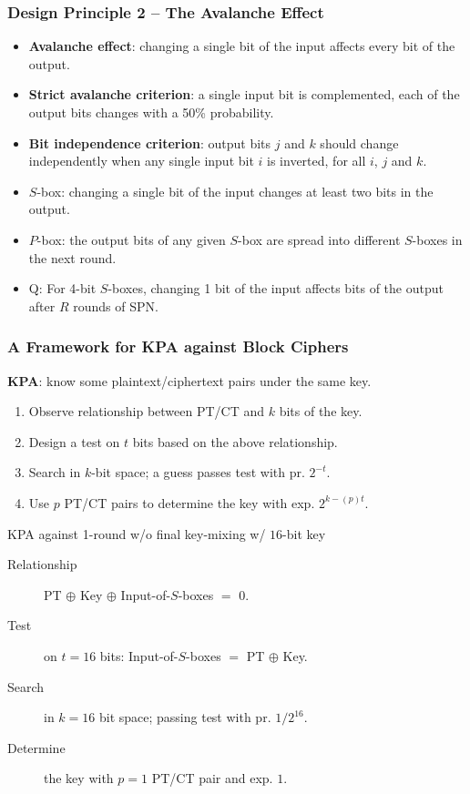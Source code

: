 \begin{frame}\frametitle{Design Principle 2 -- The Avalanche Effect}
\begin{itemize}
\item \textbf{Avalanche effect}: changing a single bit of the input affects every bit of the output.
\item \textbf{Strict avalanche criterion}: a single input bit is complemented, each of the output bits changes with a 50\% probability.
\item \textbf{Bit independence criterion}: output bits $j$ and $k$ should change independently when any single input bit $i$ is inverted, for all $i$, $j$ and $k$.
\item $S$-box: changing a single bit of the input changes at least two bits in the output.
\item $P$-box: the output bits of any given $S$-box are spread into different $S$-boxes in the next round.
\item \alert{Q: For 4-bit $S$-boxes, changing 1 bit of the input affects \underline{\qquad} bits of the output after $R$ rounds of SPN.}
\end{itemize}
\end{frame}
\begin{frame}\frametitle{A Framework for KPA against Block Ciphers}
\textbf{KPA}: know some plaintext/ciphertext pairs under the same key.
\begin{enumerate}
\item Observe relationship between PT/CT and $k$ bits of the key. 
\item Design a test on $t$ bits based on the above relationship.
\item Search in $k$-bit space; a guess passes test with pr. $2^{-t}$.
\item Use $p$ PT/CT pairs to determine the key with exp. $2^{k-(p)t}$.
\end{enumerate}
\begin{exampleblock}{KPA against 1-round w/o final key-mixing w/ $16$-bit key}
\begin{description}
\item[Relationship] PT $\oplus$ Key $\oplus$ Input-of-$S$-boxes $=$ 0.
\item[Test] on $t=16$ bits: Input-of-$S$-boxes $=$ PT $\oplus$ Key.
\item[Search] in $k=16$ bit space; passing test with pr. $1/2^{16}$.
\item[Determine] the key with $p=1$ PT/CT pair and exp. $1$.
\end{description}
\end{exampleblock}
\end{frame}
